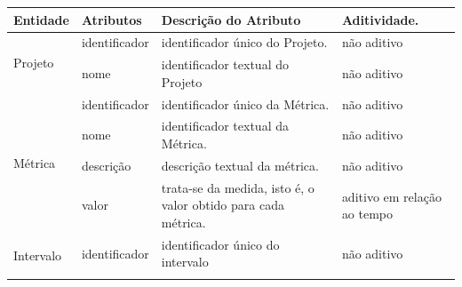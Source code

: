 \begin{table}[h]
\centering
\begin{tabular}{|p{2cm}|p{2.5cm}|p{4cm}|p{2cm}|}
\hline
Entidade                   & Atributos                & Descrição do Atributo  & Aditividade.                 \\ \hline


\multirow{2}{*}{Projeto}   & identificador            & identificador único do Projeto.                                                                                                                                                                                                       & não aditivo                 \\ \cline{2-4} 
                           & nome                     & identificador textual do Projeto                                                                                                                                                                                                      & não aditivo                 \\ \hline
\multirow{4}{*}{Métrica}   & identificador            & identificador único da Métrica.                                                                                                                                                                                                       & não aditivo                 \\ \cline{2-4} 
                           & nome                     & identificador textual da Métrica.                                                                                                                                                                                                      & não aditivo                 \\ \cline{2-4} 
                           & descrição                & descrição textual da métrica.                                                                                                                                                                                                          & não aditivo                 \\ \cline{2-4} 
                           & valor                    & trata-se da medida, isto é, o valor obtido para cada métrica.                                                                                                                                                                          & aditivo em relação ao tempo \\ \hline
\multirow{5}{*}{Intervalo} & identificador            & identificador único do intervalo                                                                                                                                                                                                      & não aditivo                 \\ \cline{2-4} 

\end{tabular}
\end{table}
